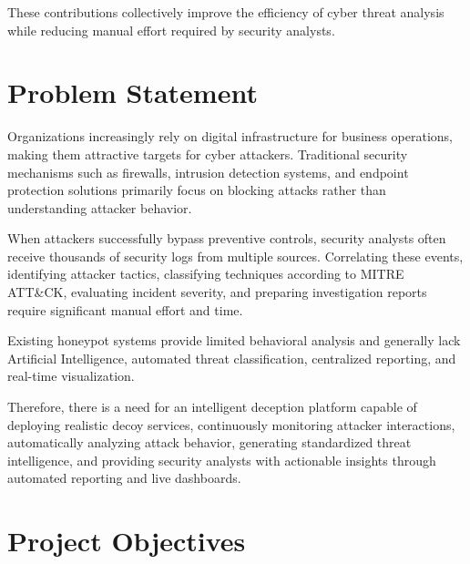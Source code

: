 \documentclass[12pt,a4paper]{report}
\begin{document}
These contributions collectively improve the efficiency of cyber threat analysis while reducing manual effort required by security analysts.


\chapter{Problem Statement}

Organizations increasingly rely on digital infrastructure for business operations, making them attractive targets for cyber attackers. Traditional security mechanisms such as firewalls, intrusion detection systems, and endpoint protection solutions primarily focus on blocking attacks rather than understanding attacker behavior.

When attackers successfully bypass preventive controls, security analysts often receive thousands of security logs from multiple sources. Correlating these events, identifying attacker tactics, classifying techniques according to MITRE ATT\&CK, evaluating incident severity, and preparing investigation reports require significant manual effort and time.

Existing honeypot systems provide limited behavioral analysis and generally lack Artificial Intelligence, automated threat classification, centralized reporting, and real-time visualization.

Therefore, there is a need for an intelligent deception platform capable of deploying realistic decoy services, continuously monitoring attacker interactions, automatically analyzing attack behavior, generating standardized threat intelligence, and providing security analysts with actionable insights through automated reporting and live dashboards.


\chapter{Project Objectives}
\end{document}
